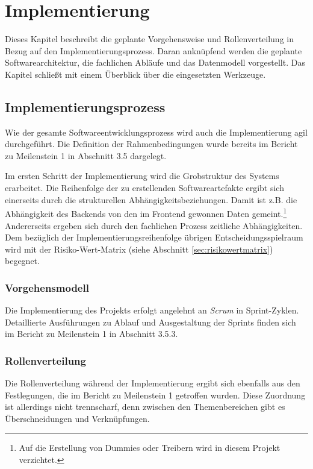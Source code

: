 \documentclass[a4paper,11pt,listof=numbered,glossary=totoc,parskip=half,toc=bib]{scrreprt}
\begin{document}
	\newpage
	\chapter{Implementierung}
	Dieses Kapitel beschreibt die geplante Vorgehensweise und Rollenverteilung in Bezug auf den Implementierungsprozess. Daran anknüpfend werden die geplante Softwarearchitektur, die fachlichen Abläufe und das Datenmodell vorgestellt. Das Kapitel schließt mit einem Überblick über die eingesetzten Werkzeuge.
	
	\section{Implementierungsprozess}
	Wie der gesamte Softwareentwicklungsprozess wird auch die Implementierung agil durchgeführt. Die Definition der Rahmenbedingungen wurde bereits im Bericht zu Meilenstein 1 in Abschnitt 3.5 dargelegt.
	
	Im ersten Schritt der Implementierung wird die Grobstruktur des Systems erarbeitet. Die Reihenfolge der zu erstellenden Softwareartefakte ergibt sich einerseits durch die strukturellen Abhängigkeitsbeziehungen. Damit ist z.B. die Abhängigkeit des Backends von den im Frontend gewonnen Daten gemeint.\footnote{Auf die Erstellung von Dummies oder Treibern wird in diesem Projekt verzichtet.} Andererseits ergeben sich durch den fachlichen Prozess zeitliche Abhängigkeiten. Dem bezüglich der Implementierungsreihenfolge übrigen Entscheidungsspielraum wird mit der Risiko-Wert-Matrix (siehe Abschnitt \ref{sec:risikowertmatrix}) begegnet.
	
	\subsection{Vorgehensmodell}
	
	Die Implementierung des Projekts erfolgt angelehnt an \textit{Scrum} in Sprint-Zyklen. Detaillierte Ausführungen zu Ablauf und Ausgestaltung der Sprints finden sich im Bericht zu Meilenstein 1 in Abschnitt 3.5.3. 
	
	\subsection{Rollenverteilung}
	Die Rollenverteilung während der Implementierung ergibt sich ebenfalls aus den Festlegungen, die im Bericht zu Meilenstein 1 getroffen wurden. Diese Zuordnung ist allerdings nicht trennscharf, denn zwischen den Themenbereichen gibt es Überschneidungen und Verknüpfungen. 
	
\end{document}
